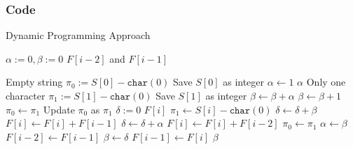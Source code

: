 \subsubsection{Code}
\setcounter{algorithm}{0}
\begin{algorithm}[H]
\caption{Dynamic Programming Approach}
\begin{algorithmic}[1]
\State $\alpha:=0, \beta:=0$ \Comment $F[i-2]$ and $F[i-1]$
\end{algorithmic}
\end{algorithm}
\begin{algorithm}[H]
\begin{algorithmic}[1]
\State {} \Comment Empty string
\EndIf
\State $\pi_0:= S[0] - \texttt{char}(0)$ \Comment Save $S[0]$ as integer
\State $\alpha\gets 1$
\EndIf
{}
\State \Return $\alpha$ \Comment Only one character
\EndIf
\State $\pi_1:=S[1] - \texttt{char}(0)$ \Comment Save $S[1]$ as integer
\State $\beta \gets \beta + \alpha$
\EndIf
{}
\State $\beta\gets \beta +1$
\EndIf
\State $\pi_0\gets \pi_1$ \Comment Update $\pi_0$ as $\pi_1$
\State $\delta:=0$ \Comment $F[i]$
\State $\pi_1 \gets S[i] - \texttt{char}(0)$
\State $\delta \gets \delta + \beta$ \Comment $F[i] \gets F[i] + F[i-1]$
\EndIf
{}
\State $\delta\gets \delta + \alpha$ \Comment $F[i] \gets F[i] + F[i-2]$
\EndIf
\State $\pi_0\gets \pi_1$
\State $\alpha\gets \beta$ \Comment $F[i-2]\gets F[i-1]$
\State $\beta \gets \delta$ \Comment $F[i-1]\gets F[i]$
\EndFor
\State \Return $\beta$
\EndProcedure
\end{algorithmic}
\end{algorithm}